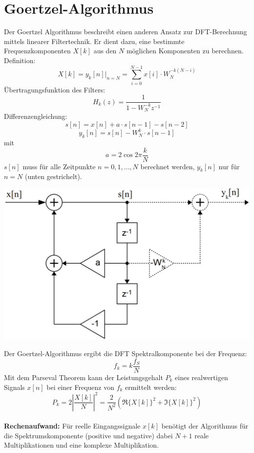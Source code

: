 \section{Goertzel-Algorithmus}
Der Goertzel Algorithmus beschreibt einen anderen Ansatz zur DFT-Berechnung mittels linearer Filtertechnik. Er dient dazu, eine bestimmte Frequenzkomponenten $X[k]$ aus den $N$ möglichen Komponenten zu berechnen. Definition:
\[ X[k] = y_k[n]|_{n=N} = \sum_{i=0}^{N-1}x[i] \cdot W_N^{-k(N-i)} \]
Übertragungsfunktion des Filters:
\[H_k(z) = \frac{1}{1-W_N^{-k}z^{-1}} \]
Differenzengleichung:
\[ s[n] = x[n] + a \cdot s[n-1] - s[n-2] \]
\[ y_k[n] = s[n] - W_N^k \cdot s[n-1] \]
mit 
\[ a= 2\cos 2\pi\frac{k}{N} \]
$s[n]$ muss für alle Zeitpunkte $n=0,1,\ldots,N$ berechnet werden, $y_k[n]$
nur für $n=N$ (unten gestrichelt).

\begin{center}
	\includegraphics[width=.45\textwidth]{../fig/goertzel}
\end{center}
Der Goertzel-Algorithmus ergibt die DFT Spektralkomponente bei der Frequenz:
\[ f_k = k\frac{f_S}{N} \]
Mit dem Parseval Theorem kann der Leistungsgehalt $P_k$ eines realwertigen
Signals $x[n]$ bei einer Frequenz von $f_k$ ermittelt werden:
\[
	P_k = 2\left| \frac{X[k]}{N} \right|^2
		= \frac{2}{N^2}(\Re\{X[k]\}^2+\Im\{X[k]\}^2)
\]
~\\
\textbf{Rechenaufwand: }
Für reelle Eingangssignale $x[k]$ benötigt der Algorithmus für die Spektrumskomponente 
(positive und negative) dabei $N+1$ reale Multiplikationen und eine komplexe Multiplikation.